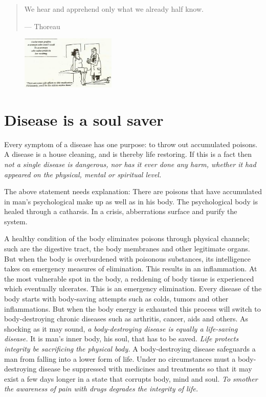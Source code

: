 \documentclass[landscape,twocolumn,letterpaper]{article}
\begin{document}
\begin{quote} We hear and apprehend only what we already half know.

--- Thoreau
\end{quote}


\begin{figure} \centering
  \includegraphics[width=0.4\textwidth,bb= 0 0 476 269]{p24.jpg}
\end{figure}


\section{Disease is a soul saver}
\label{sec:diass}

Every symptom of a disease has one purpose: to throw out accumulated
poisons. A disease is a house cleaning, and is thereby life
restoring. If this is a fact then \emph{not a single disease is
dangerous, nor has it ever done any harm, whether it had appeared on
the physical, mental or spiritual level.}

The above statement needs explanation: There are poisons that have
accumulated in man's psychological make up as well as in his body. The
psychological body is healed through a catharsis. In a crisis,
abberrations surface and purify the system.

A healthy condition of the body eliminates poisons through physical
channels; such are the digestive tract, the body membranes and other
legitimate organs. But when the body is overburdened with poisonous
substances, its intelligence takes on emergency measures of
elimination. This results in an inflammation. At the most vulnerable
spot in the body, a reddening of body tissue is experienced which
eventually ulcerates. This is an emergency elimination. Every disease
of the body starts with body-saving attempts such as colds, tumors and
other inflammations. But when the body energy is exhausted this
process will switch to body-destroying chronic diseases such as
arthritis, cancer, aids and others. As shocking as it may sound,
\emph{a body-destroying disease is equally a life-saving disease.} It
is man's inner body, his soul, that has to be saved. \emph{Life
protects integrity be sacrificing the physical body.} A
body-destroying disease safeguards a man from falling into a lower
form of life. Under no circumstances must a body-destroying disease be
suppressed with medicines and treatments so that it may exist a few
days longer in a state that corrupts body, mind and soul. \emph{To
smother the awareness of pain with drugs degrades the integrity of
life.}
\end{document}
